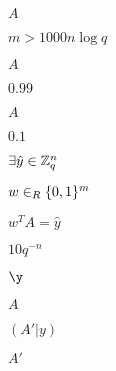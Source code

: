 \documentclass[10pt]{book}
\begin{document}
\begin{mdSnippets}
\begin{mdInlineSnippet}[7fc56270e7a70fa81a5935b72eacbe29]
$A$\end{mdInlineSnippet}%
\begin{mdInlineSnippet}[0285994f32e717aa785cb7fb36c46fde]%
$m > 1000n \log q$\end{mdInlineSnippet}%
\begin{mdInlineSnippet}[7fc56270e7a70fa81a5935b72eacbe29]%
$A$\end{mdInlineSnippet}%
\begin{mdInlineSnippet}%
$0.99$\end{mdInlineSnippet}%
\begin{mdInlineSnippet}[7fc56270e7a70fa81a5935b72eacbe29]%
$A$\end{mdInlineSnippet}%
\begin{mdInlineSnippet}[cb5ae17636e975f9bf71ddf5bc542075]%
$0.1$\end{mdInlineSnippet}%
\begin{mdInlineSnippet}%
$\exists \hat{y} \in \mathbb{Z}_q^n$\end{mdInlineSnippet}%
\begin{mdInlineSnippet}[8d117c0e829de49255c23409dc643b81]%
$w \in_R \{0,1\}^m$\end{mdInlineSnippet}%
\begin{mdInlineSnippet}[b6441b8ff8e1e72da55140a40ef0d00e]%
$w^T A = \hat{y}$\end{mdInlineSnippet}%
\begin{mdInlineSnippet}[fd2d3c577f03b2f1673f677d541644ae]%
$10 q^{-n}$\end{mdInlineSnippet}%
\begin{mdInlineSnippet}[6466e513641d2e6ea10008cc13c0d2bb]%
$\y$\end{mdInlineSnippet}%
\begin{mdInlineSnippet}[7fc56270e7a70fa81a5935b72eacbe29]%
$A$\end{mdInlineSnippet}%
\begin{mdInlineSnippet}[b42adbed9436981d2f26a1f5b54c76ee]%
$(A'|y)$\end{mdInlineSnippet}%
\begin{mdInlineSnippet}[37a12b78a9ca96989ad7ceceacb37ea2]%
$A'$\end{mdInlineSnippet}%

\end{mdSnippets}
\end{document}
